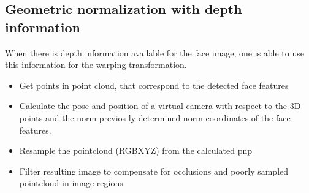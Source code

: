 \subsection{Geometric normalization with depth information}
When there is depth information available for the face image, one is able to use this information for the warping transformation.

\begin{itemize}
\item Get points in point cloud, that correspond to the detected face features
\item Calculate the pose and position of a virtual camera with respect to the 3D points and the norm previos
ly determined norm coordinates of the face features.
\item Resample the pointcloud (RGBXYZ) from the calculated pnp
\item Filter resulting image to compensate for occlusions and poorly sampled pointcloud in image regions
\end{itemize}



